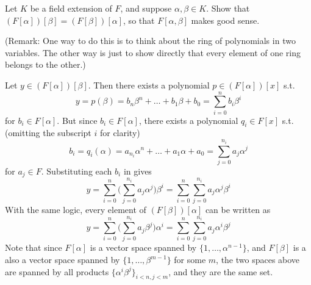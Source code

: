   \begin{exercise}[Shifrin 3.2.13]
    Let $K$ be a field extension of $F$, and suppose $\alpha, \beta \in K$. Show that $(F[\alpha])[\beta] = (F[\beta])[\alpha]$, so that $F[\alpha, \beta]$ makes good sense.
    
    (Remark: One way to do this is to think about the ring of polynomials in two variables. The other way is just to show directly that every element of one ring belongs to the other.)
  \end{exercise}
  \begin{solution}
    Let $y \in (F[\alpha])[\beta]$. Then there exists a polynomial $p \in (F[\alpha])[x]$ s.t. 
    \begin{equation}
      y = p(\beta) = b_n \beta^n + \ldots + b_1 \beta + b_0 = \sum_{i=0}^n b_i \beta^i 
    \end{equation}
    for $b_i \in F[\alpha]$. But since $b_i \in F[\alpha]$, there exists a polynomial $q_i \in F[x]$ s.t. (omitting the subscript $i$ for clarity)
    \begin{equation}
      b_i = q_i (\alpha) = a_{n_i} \alpha^n + \ldots + a_1 \alpha + a_0 = \sum_{j=0}^{n_i} a_{j} \alpha^j 
    \end{equation}
    for $a_j \in F$. Substituting each $b_i$ in gives   
    \begin{equation}
      y = \sum_{i=0}^n \bigg( \sum_{j=0}^{n_i} a_j \alpha^j \bigg) \beta^i = \sum_{i=0}^n \sum_{j=0}^{n_i} a_j \alpha^j \beta^i
    \end{equation}
    With the same logic, every element of $(F[\beta])[\alpha]$ can be written as 
    \begin{equation}
      y = \sum_{i=0}^n \bigg( \sum_{j=0}^{n_i} a_j \beta^j \bigg) \alpha^i = \sum_{i=0}^n \sum_{j=0}^{n_i} a_j \alpha^i \beta^j
    \end{equation}
    Note that since $F[\alpha]$ is a vector space spanned by $\{1, \ldots, \alpha^{n-1}\}$, and $F[\beta]$ is a also a vector space spanned by $\{1, \ldots, \beta^{m-1}\}$ for some $m$, the two spaces above are spanned by all products $\{\alpha^i \beta^j\}_{i < n, j < m}$, and they are the same set. 
  \end{solution}

